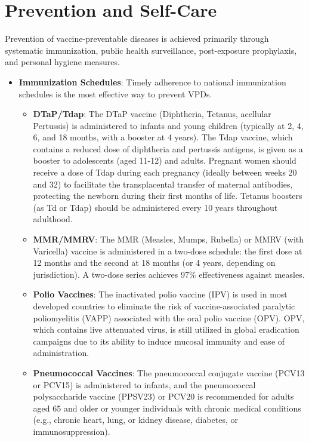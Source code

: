 \section*{Prevention and Self-Care}
Prevention of vaccine-preventable diseases is achieved primarily through systematic immunization, public health surveillance, post-exposure prophylaxis, and personal hygiene measures.
\begin{itemize}
    \item \textbf{Immunization Schedules}: Timely adherence to national immunization schedules is the most effective way to prevent VPDs.
    \begin{itemize}
        \item \textbf{DTaP/Tdap}: The DTaP vaccine (Diphtheria, Tetanus, acellular Pertussis) is administered to infants and young children (typically at 2, 4, 6, and 18 months, with a booster at 4 years). The Tdap vaccine, which contains a reduced dose of diphtheria and pertussis antigens, is given as a booster to adolescents (aged 11-12) and adults. Pregnant women should receive a dose of Tdap during each pregnancy (ideally between weeks 20 and 32) to facilitate the transplacental transfer of maternal antibodies, protecting the newborn during their first months of life. Tetanus boosters (as Td or Tdap) should be administered every 10 years throughout adulthood.
        \item \textbf{MMR/MMRV}: The MMR (Measles, Mumps, Rubella) or MMRV (with Varicella) vaccine is administered in a two-dose schedule: the first dose at 12 months and the second at 18 months (or 4 years, depending on jurisdiction). A two-dose series achieves 97\% effectiveness against measles.
        \item \textbf{Polio Vaccines}: The inactivated polio vaccine (IPV) is used in most developed countries to eliminate the risk of vaccine-associated paralytic poliomyelitis (VAPP) associated with the oral polio vaccine (OPV). OPV, which contains live attenuated virus, is still utilized in global eradication campaigns due to its ability to induce mucosal immunity and ease of administration.
        \item \textbf{Pneumococcal Vaccines}: The pneumococcal conjugate vaccine (PCV13 or PCV15) is administered to infants, and the pneumococcal polysaccharide vaccine (PPSV23) or PCV20 is recommended for adults aged 65 and older or younger individuals with chronic medical conditions (e.g., chronic heart, lung, or kidney disease, diabetes, or immunosuppression).
    \end{itemize}

\end{itemize}
